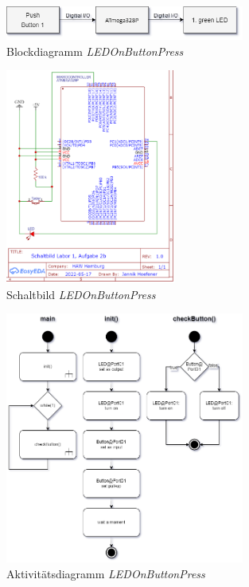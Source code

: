 \documentclass{article}
\begin{document}

\begin{figure}[htb]
    \centering
    \includegraphics[width=0.7\textwidth]{images/A2b-BD-LEDOnButtonPressmitShield.d.png}
    \caption{Blockdiagramm \textit{LEDOnButtonPress}}
    \label{fig:bd-a2b}
\end{figure}

\begin{figure}[htb]
    \centering
    \includegraphics[width=0.5\textwidth]{images/A2b-Schaltbild.png}
    \caption{Schaltbild \textit{LEDOnButtonPress}}
    \label{fig:sb-a2b}
\end{figure}

\newpage
\vfill

\begin{figure}[]
    \centering
    \includegraphics[width=0.7\textwidth]{images/A2b-AD.png}
    \caption{Aktivitätsdiagramm \textit{LEDOnButtonPress}}
    \label{fig:ad-a2b}
\end{figure}
\end{document}

